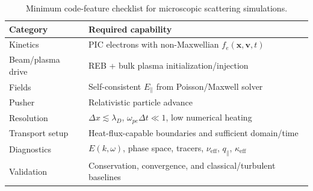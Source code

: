 \documentclass[11pt,a4paper]{article}
\begin{document}
\begin{table}[h]
\centering
\begin{tabular}{p{}p{}}
\toprule
\textbf{Category} & \textbf{Required capability} \\
\midrule
Kinetics & PIC electrons with non-Maxwellian $f_e(\mathbf{x},\mathbf{v},t)$ \\
Beam/plasma drive & REB + bulk plasma initialization/injection \\
Fields & Self-consistent $E_\parallel$ from Poisson/Maxwell solver \\
Pusher & Relativistic particle advance \\
Resolution & $\Delta x\lesssim\lambda_D$, $\omega_{pe}\Delta t\ll1$, low numerical heating \\
Transport setup & Heat-flux-capable boundaries and sufficient domain/time \\
Diagnostics & $E(k,\omega)$, phase space, tracers, $\nu_{\mathrm{eff}}$, $q_\parallel$, $\kappa_{\mathrm{eff}}$ \\
Validation & Conservation, convergence, and classical/turbulent baselines \\
\bottomrule
\end{tabular}
\caption{Minimum code-feature checklist for microscopic scattering simulations.}
\end{table}
\end{document}
